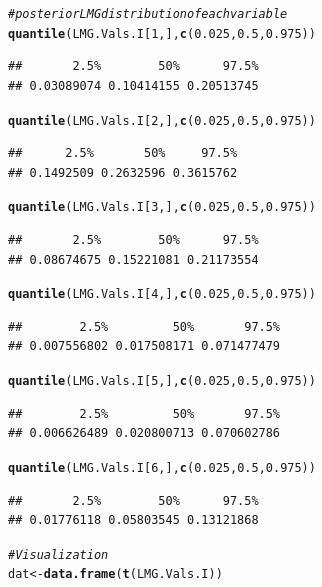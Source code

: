 \documentclass[11pt,a4paper,twoside]{book}
\makeatletter
\newcommand{\hlnum}[1]{\textcolor[rgb]{0.686,0.059,0.569}{#1}}%
\newcommand{\hlcom}[1]{\textcolor[rgb]{0.678,0.584,0.686}{\textit{#1}}}%
\newcommand{\hlstd}[1]{\textcolor[rgb]{0.345,0.345,0.345}{#1}}%
\newcommand{\hlkwb}[1]{\textcolor[rgb]{0.69,0.353,0.396}{#1}}%
\newcommand{\hlkwd}[1]{\textcolor[rgb]{0.737,0.353,0.396}{\textbf{#1}}}%
\newenvironment{kframe}{%
 \def\at@end@of@kframe{}%
 \ifinner\ifhmode%
  \def\at@end@of@kframe{\end{minipage}}%
  \begin{minipage}{\columnwidth}%
 \fi\fi%
 \def\FrameCommand##1{\hskip\@totalleftmargin \hskip-\fboxsep
 \colorbox{shadecolor}{##1}\hskip-\fboxsep
     \hskip-\linewidth \hskip-\@totalleftmargin \hskip\columnwidth}%
 \MakeFramed {\advance\hsize-\width
   \@totalleftmargin\z@ \linewidth\hsize
   \@setminipage}}%
 {\par\unskip\endMakeFramed%
 \at@end@of@kframe}
\newenvironment{knitrout}{}{} %
\makeatother
\begin{document}
\begin{knitrout}
\begin{kframe}
\begin{alltt}
\hlcom{# posterior LMG distribution of each variable}
\hlkwd{quantile}\hlstd{(LMG.Vals.I[}\hlnum{1}\hlstd{,],} \hlkwd{c}\hlstd{(}\hlnum{0.025}\hlstd{,} \hlnum{0.5}\hlstd{,} \hlnum{0.975}\hlstd{))}
\end{alltt}
\begin{verbatim}
##       2.5%        50%      97.5% 
## 0.03089074 0.10414155 0.20513745
\end{verbatim}
\begin{alltt}
\hlkwd{quantile}\hlstd{(LMG.Vals.I[}\hlnum{2}\hlstd{,],} \hlkwd{c}\hlstd{(}\hlnum{0.025}\hlstd{,} \hlnum{0.5}\hlstd{,} \hlnum{0.975}\hlstd{))}
\end{alltt}
\begin{verbatim}
##      2.5%       50%     97.5% 
## 0.1492509 0.2632596 0.3615762
\end{verbatim}
\begin{alltt}
\hlkwd{quantile}\hlstd{(LMG.Vals.I[}\hlnum{3}\hlstd{,],} \hlkwd{c}\hlstd{(}\hlnum{0.025}\hlstd{,} \hlnum{0.5}\hlstd{,} \hlnum{0.975}\hlstd{))}
\end{alltt}
\begin{verbatim}
##       2.5%        50%      97.5% 
## 0.08674675 0.15221081 0.21173554
\end{verbatim}
\begin{alltt}
\hlkwd{quantile}\hlstd{(LMG.Vals.I[}\hlnum{4}\hlstd{,],} \hlkwd{c}\hlstd{(}\hlnum{0.025}\hlstd{,} \hlnum{0.5}\hlstd{,} \hlnum{0.975}\hlstd{))}
\end{alltt}
\begin{verbatim}
##        2.5%         50%       97.5% 
## 0.007556802 0.017508171 0.071477479
\end{verbatim}
\begin{alltt}
\hlkwd{quantile}\hlstd{(LMG.Vals.I[}\hlnum{5}\hlstd{,],} \hlkwd{c}\hlstd{(}\hlnum{0.025}\hlstd{,} \hlnum{0.5}\hlstd{,} \hlnum{0.975}\hlstd{))}
\end{alltt}
\begin{verbatim}
##        2.5%         50%       97.5% 
## 0.006626489 0.020800713 0.070602786
\end{verbatim}
\begin{alltt}
\hlkwd{quantile}\hlstd{(LMG.Vals.I[}\hlnum{6}\hlstd{,],} \hlkwd{c}\hlstd{(}\hlnum{0.025}\hlstd{,} \hlnum{0.5}\hlstd{,} \hlnum{0.975}\hlstd{))}
\end{alltt}
\begin{verbatim}
##       2.5%        50%      97.5% 
## 0.01776118 0.05803545 0.13121868
\end{verbatim}
\begin{alltt}
\hlcom{#Visualization}
\hlstd{dat} \hlkwb{<-} \hlkwd{data.frame}\hlstd{(}\hlkwd{t}\hlstd{(LMG.Vals.I))}


\end{alltt}
\end{kframe}
\end{knitrout}
\end{document}

